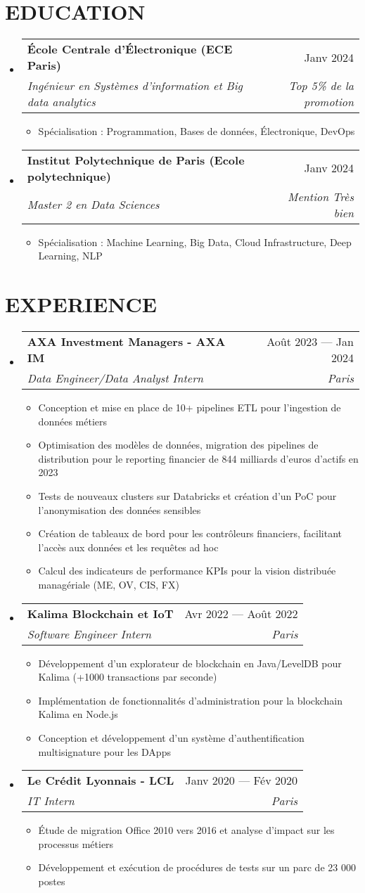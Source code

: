 \documentclass[letterpaper,11pt]{article}
\makeatletter
\newcommand{\resumeItem}[1]{
  \item\small{
    {#1 \vspace{-1pt}}
  }
}
\newcommand{\resumeSubheading}[4]{
  \vspace{-1pt}\item
    \begin{tabular*}{\textwidth}[t]{l@{\extracolsep{\fill}}r}
      \textbf{#1} & #2 \\
      \textit{#3} & \textit{#4} \\
    \end{tabular*}\vspace{-4pt}
}
\newcommand{\resumeSubHeadingListStart}{\begin{itemize}[leftmargin=0in, label={}]}
\newcommand{\resumeSubHeadingListEnd}{\end{itemize}}
\newcommand{\resumeItemListStart}{\begin{itemize}[label={\textbullet}]}
\newcommand{\resumeItemListEnd}{\end{itemize}\vspace{0pt}}
\makeatother
\begin{document}
\section{EDUCATION}
\resumeSubHeadingListStart
    \resumeSubheading
      {École Centrale d'Électronique (ECE Paris)}
      {Janv 2024}
      {Ingénieur en Systèmes d'information et Big data analytics}
      {Top 5\% de la promotion}
      \resumeItemListStart
        \resumeItem{Spécialisation : Programmation, Bases de données, Électronique, DevOps}
      \resumeItemListEnd
    \resumeSubheading
      {Institut Polytechnique de Paris (Ecole polytechnique)}
      {Janv 2024}
      {Master 2 en Data Sciences}
      {Mention Très bien}
      \resumeItemListStart
        \resumeItem{Spécialisation : Machine Learning, Big Data, Cloud Infrastructure, Deep Learning, NLP}
      \resumeItemListEnd
  \resumeSubHeadingListEnd

\section{EXPERIENCE}
\resumeSubHeadingListStart
    \resumeSubheading
      {AXA Investment Managers - AXA IM}{Août 2023 --- Jan 2024}
      {Data Engineer/Data Analyst Intern}{Paris}
      \resumeItemListStart
        \resumeItem{Conception et mise en place de 10+ pipelines ETL pour l'ingestion de données métiers}
        \resumeItem{Optimisation des modèles de données, migration des pipelines de distribution pour le reporting financier de 844 milliards d'euros d'actifs en 2023}
        \resumeItem{Tests de nouveaux clusters sur Databricks et création d'un PoC pour l'anonymisation des données sensibles}
        \resumeItem{Création de tableaux de bord pour les contrôleurs financiers, facilitant l'accès aux données et les requêtes ad hoc}
        \resumeItem{Calcul des indicateurs de performance KPIs pour la vision distribuée managériale (ME, OV, CIS, FX)}
      \resumeItemListEnd
    \resumeSubheading
      {Kalima Blockchain et IoT}{Avr 2022 --- Août 2022}
      {Software Engineer Intern}{Paris}
      \resumeItemListStart
        \resumeItem{Développement d'un explorateur de blockchain en Java/LevelDB pour Kalima (+1000 transactions par seconde)}
        \resumeItem{Implémentation de fonctionnalités d'administration pour la blockchain Kalima en Node.js}
        \resumeItem{Conception et développement d'un système d'authentification multisignature pour les DApps}
      \resumeItemListEnd
    \resumeSubheading
      {Le Crédit Lyonnais - LCL}{Janv 2020 --- Fév 2020}
      {IT Intern}{Paris}
      \resumeItemListStart
        \resumeItem{Étude de migration Office 2010 vers 2016 et analyse d'impact sur les processus métiers}
        \resumeItem{Développement et exécution de procédures de tests sur un parc de 23 000 postes}
      \resumeItemListEnd
  \resumeSubHeadingListEnd
\end{document}
